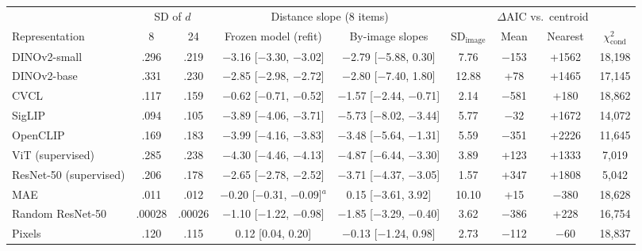 \begin{tabular}{lcccccccc}
\toprule
 & \multicolumn{2}{c}{SD of $d$} & \multicolumn{2}{c}{Distance slope (8 items)} & & \multicolumn{2}{c}{$\Delta$AIC vs.\ centroid} & \\ \cmidrule(lr){2-3}\cmidrule(lr){4-5}\cmidrule(lr){7-8}
Representation & 8 & 24 & Frozen model (refit) & By-image slopes & SD$_{\text{image}}$ & Mean & Nearest & $\chi^2_{\text{cond}}$ \\
\midrule
DINOv2-small & .296 & .219 & \ensuremath{-}3.16 [\ensuremath{-}3.30, \ensuremath{-}3.02] & \ensuremath{-}2.79 [\ensuremath{-}5.88, 0.30] & 7.76 & \ensuremath{-}153 & +1562 & 18{,}198 \\
DINOv2-base & .331 & .230 & \ensuremath{-}2.85 [\ensuremath{-}2.98, \ensuremath{-}2.72] & \ensuremath{-}2.80 [\ensuremath{-}7.40, 1.80] & 12.88 & +78 & +1465 & 17{,}145 \\
CVCL & .117 & .159 & \ensuremath{-}0.62 [\ensuremath{-}0.71, \ensuremath{-}0.52] & \ensuremath{-}1.57 [\ensuremath{-}2.44, \ensuremath{-}0.71] & 2.14 & \ensuremath{-}581 & +180 & 18{,}862 \\
SigLIP & .094 & .105 & \ensuremath{-}3.89 [\ensuremath{-}4.06, \ensuremath{-}3.71] & \ensuremath{-}5.73 [\ensuremath{-}8.02, \ensuremath{-}3.44] & 5.77 & \ensuremath{-}32 & +1672 & 14{,}072 \\
OpenCLIP & .169 & .183 & \ensuremath{-}3.99 [\ensuremath{-}4.16, \ensuremath{-}3.83] & \ensuremath{-}3.48 [\ensuremath{-}5.64, \ensuremath{-}1.31] & 5.59 & \ensuremath{-}351 & +2226 & 11{,}645 \\
ViT (supervised) & .285 & .238 & \ensuremath{-}4.30 [\ensuremath{-}4.46, \ensuremath{-}4.13] & \ensuremath{-}4.87 [\ensuremath{-}6.44, \ensuremath{-}3.30] & 3.89 & +123 & +1333 & 7{,}019 \\
ResNet-50 (supervised) & .206 & .178 & \ensuremath{-}2.65 [\ensuremath{-}2.78, \ensuremath{-}2.52] & \ensuremath{-}3.71 [\ensuremath{-}4.37, \ensuremath{-}3.05] & 1.57 & +347 & +1808 & 5{,}042 \\
MAE & .011 & .012 & \ensuremath{-}0.20 [\ensuremath{-}0.31, \ensuremath{-}0.09]$^{a}$ & 0.15 [\ensuremath{-}3.61, 3.92] & 10.10 & +15 & \ensuremath{-}380 & 18{,}628 \\
Random ResNet-50 & .00028 & .00026 & \ensuremath{-}1.10 [\ensuremath{-}1.22, \ensuremath{-}0.98] & \ensuremath{-}1.85 [\ensuremath{-}3.29, \ensuremath{-}0.40] & 3.62 & \ensuremath{-}386 & +228 & 16{,}754 \\
Pixels & .120 & .115 & 0.12 [0.04, 0.20] & \ensuremath{-}0.13 [\ensuremath{-}1.24, 0.98] & 2.73 & \ensuremath{-}112 & \ensuremath{-}60 & 18{,}837 \\
\bottomrule
\end{tabular}
